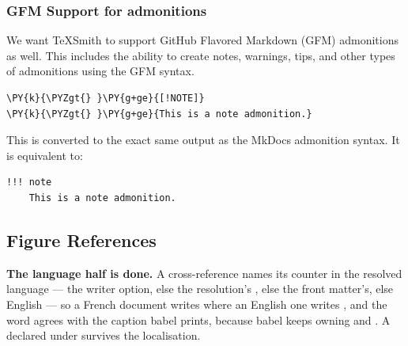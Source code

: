 \documentclass[a4paper,twoside]{article}
\begin{document}
\subsubsection{GFM Support for admonitions}
We want TeXSmith to support GitHub Flavored Markdown (GFM) admonitions as well. This includes the ability to create notes, warnings, tips, and other types of admonitions using the GFM syntax.
\begin{tscode}[lang=md, engine=pygments]
\begin{Verbatim}[commandchars=\\\{\},breaklines, breakanywhere, commandchars=\\\{\}]
\PY{k}{\PYZgt{} }\PY{g+ge}{[!NOTE]}
\PY{k}{\PYZgt{} }\PY{g+ge}{This is a note admonition.}
\end{Verbatim}
\end{tscode}
This is converted to the exact same output as the MkDocs admonition syntax. It is equivalent to:
\begin{tscode}[lang=md, engine=pygments]
\begin{Verbatim}[commandchars=\\\{\},breaklines, breakanywhere, commandchars=\\\{\}]
!!! note
    This is a note admonition.
\end{Verbatim}
\end{tscode}
\subsection{Figure References}
\textbf{The language half is done.} A cross-reference names its counter in the
resolved language --- the writer option, else the resolution's , else the
front matter's, else English --- so a French document writes  where an
English one writes , and the word agrees with the caption babel
prints, because babel keeps owning  and . A 
declared under  survives the localisation.
\end{document}
